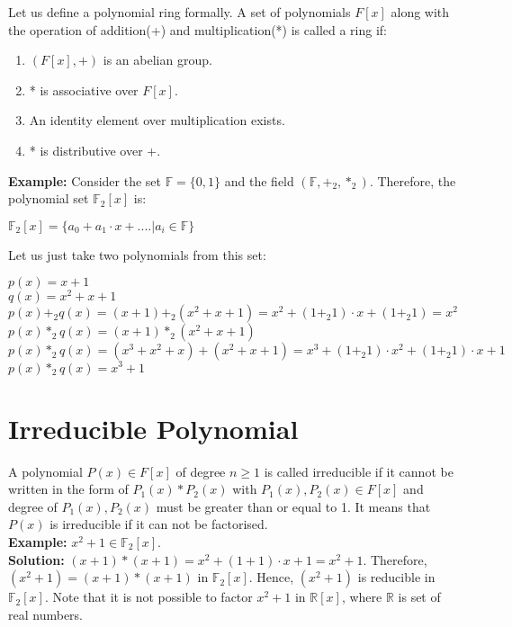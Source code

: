 \documentclass[11pt]{article}
\begin{document}
Let us define a polynomial ring formally. A set of polynomials $F[x]$ along with the operation of addition(+) and multiplication(*) is called a ring if:
\begin{enumerate}
    \item $(F[x], +)$ is an abelian group.
    \item * is associative over $F[x]$.
    \item An identity element over multiplication exists.
    \item * is distributive over +.
\end{enumerate}

\textbf{Example:} Consider the set $\mathbb{F} = \{0, 1\}$ and the field $(\mathbb{F}, +_2, *_2)$. Therefore, the polynomial set $\mathbb{F}_2[x]$ is:
\begin{center} 
    $\mathbb{F}_2[x] = \{a_0 + a_1 \cdot x + .... | a_i \in \mathbb{F}\}$
\end{center}
Let us just take two polynomials from this set:
\begin{center}
    $p(x) = x + 1$\\
    \vspace{1mm}
    $q(x) = x^2 + x + 1$\\
    \vspace{1mm}
    $p(x) +_2 q(x) = (x + 1) +_2 (x^2 + x + 1) = x^2 + (1 +_2 1) \cdot x + (1 +_2 1) = x^2$ \\
    \vspace{1mm}
    $p(x) *_2 q(x) = (x + 1) *_2 (x^2 + x + 1)$\\
    \vspace{1mm}
    $p(x) *_2 q(x) = (x^3 + x^2 + x) + (x^2 + x + 1) = x^3 + (1 +_2 1) \cdot x^2 + (1 +_2 1) \cdot x + 1$\\
    \vspace{1mm}
    $p(x) *_2 q(x) = x^3 + 1$
\end{center}

\section{Irreducible Polynomial}
A polynomial $P(x) \in F[x]$ of degree $n \geq 1$ is called irreducible if it cannot be written in the form of $P_1(x) * P_2(x)$ with $P_1(x), P_2(x) \in F[x]$ and degree of $P_1(x), P_2(x)$ must be greater than or equal to 1. It means that $P(x)$ is irreducible if it can not be factorised.\\
\newline
\textbf{Example:} $x^2 + 1 \in \mathbb{F}_2[x]$.\\
\textbf{Solution:} $(x + 1) * (x + 1) = x^2 + (1 + 1) \cdot x + 1 = x^2 + 1$. Therefore, $(x^2 + 1) =  (x + 1) * (x + 1)$ in $\mathbb{F}_2[x]$. Hence, $(x^2 + 1)$ is reducible in $\mathbb{F}_2[x]$. Note that it is not possible to factor $x^2 + 1$ in $\mathbb{R}[x]$, where $\mathbb{R}$ is set of real numbers.\\
\end{document}
